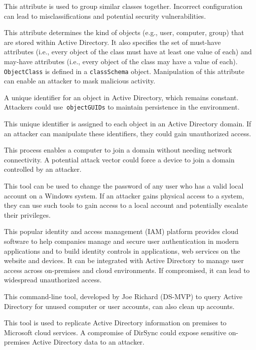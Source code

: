  This attribute is used to group similar classes together. Incorrect configuration can lead to misclassifications and potential security vulnerabilities.

 This attribute determines the kind of objects (e.g., user, computer, group) that are stored within Active Directory. It also specifies the set of must-have attributes (i.e., every object of the class must have at least one value of each) and may-have attributes (i.e., every object of the class may have a value of each). \texttt{ObjectClass} is defined in a \texttt{classSchema} object. Manipulation of this attribute can enable an attacker to mask malicious activity.

 A unique identifier for an object in Active Directory, which remains constant. Attackers could use\texttt{ objectGUIDs} to maintain persistence in the environment.

 This unique identifier is assigned to each object in an Active Directory domain. If an attacker can manipulate these identifiers, they could gain unauthorized access.

 This process enables a computer to join a domain without needing network connectivity. A potential attack vector could force a device to join a domain controlled by an attacker.

 This tool can be used to change the password of any user who has a valid local account on a Windows system. If an attacker gains physical access to a system, they can use such tools to gain access to a local account and potentially escalate their privileges.

 This popular identity and access management (IAM) platform provides cloud software to help companies manage and secure user authentication in modern applications and to build identity controls in applications, web services on the website and devices. It can be integrated with Active Directory to manage user access across on-premises and cloud environments. If compromised, it can lead to widespread unauthorized access.

 This command-line tool, developed by Joe Richard (DS-MVP) to query Active Directory for unused computer or user accounts, can also clean up accounts.

 This tool is used to replicate Active Directory information on premises to Microsoft cloud services. A compromise of DirSync could expose sensitive on-premises Active Directory data to an attacker.

